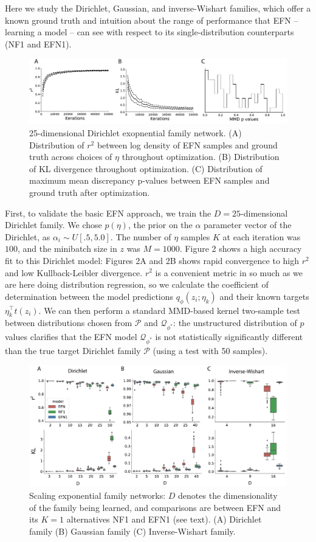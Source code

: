 \documentclass[twoside]{article}
\begin{document}
Here we study the Dirichlet, Gaussian, and inverse-Wishart families, which offer a known ground truth and intuition about the range of performance that EFN -- learning a model -- can see with respect to its single-distribution counterparts (NF1 and EFN1).  
%
\begin{figure}
  \centering
\includegraphics[scale=0.25]{figs/fig2/fig2.pdf}
  \caption{25-dimensional Dirichlet exopnential family network.  (A) Distribution of $r^2$ between log density of EFN samples and ground truth across choices of $\eta$ throughout optimization.  (B) Distribution of KL divergence throughout optimization.  (C) Distribution of maximum mean discrepancy p-values between EFN samples and ground truth after optimization.}
\end{figure}
%
First, to validate the basic EFN approach, we train the $D=25$-dimensional Dirichlet family.  We chose $p(\eta)$, the prior on the $\alpha$ parameter vector of the Dirichlet, as $\alpha_i \sim U\left[.5, 5.0\right]$. The number of $\eta$ samples $K$ at each iteration was $100$, and the minibatch size in $z$ was $M=1000$.   Figure 2 shows a high accuracy fit to this Dirichlet model: Figures 2A and 2B shows rapid convergence to high $r^2$ and low Kullback-Leibler divergence.  $r^2$ is a convenient metric in so much as we are here doing distribution regression, so we calculate the coefficient of determination between the model predictions $q_\phi(z_i; \eta_k)$ and their known targets $\eta_k^\top t(z_i)$.  We can then perform a standard MMD-based kernel two-sample test \cite{gretton2012kernel} between distributions chosen from $\mathcal{P}$ and $\mathcal{Q}_{\phi^*}$: the unstructured distribution of $p$ values clarifies that the EFN model $\mathcal{Q}_{\phi^*}$  is not statistically significantly different than the true target Dirichlet family $\mathcal{P}$ (using a test with 50 samples).
%
 \begin{figure}
  \centering
\includegraphics[scale=0.25]{figs/fig3/fig3.pdf}
  \caption{Scaling exponential family networks: $D$ denotes the dimensionality of the family being learned, and comparisons are between EFN and its $K=1$ alternatives NF1 and EFN1 (see text).  (A) Dirichlet family (B) Gaussian family  (C) Inverse-Wishart family.}
\end{figure}
\end{document}
